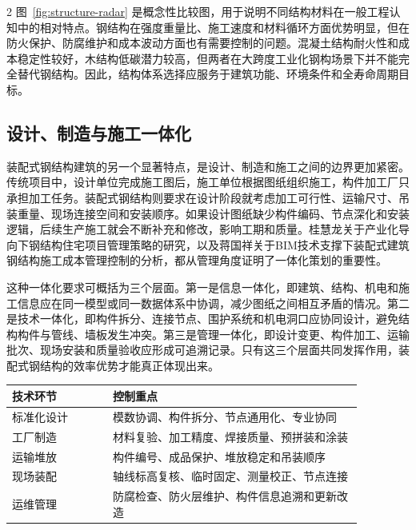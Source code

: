 ﻿\documentclass[UTF8,a4paper,10.5pt]{ctexart}
\newenvironment{bodytext}{\fontsize{10.5pt}{16pt}\selectfont\songti}{}
\begin{document}
\begin{bodytext}
\begin{multicols}{2}
图~\ref{fig:structure-radar} 是概念性比较图，用于说明不同结构材料在一般工程认知中的相对特点。钢结构在强度重量比、施工速度和材料循环方面优势明显，但在防火保护、防腐维护和成本波动方面也有需要控制的问题。混凝土结构耐火性和成本稳定性较好，木结构低碳潜力较高，但两者在大跨度工业化钢构场景下并不能完全替代钢结构。因此，结构体系选择应服务于建筑功能、环境条件和全寿命周期目标。

\subsection{设计、制造与施工一体化}

装配式钢结构建筑的另一个显著特点，是设计、制造和施工之间的边界更加紧密。传统项目中，设计单位完成施工图后，施工单位根据图纸组织施工，构件加工厂只承担加工任务。装配式钢结构则要求在设计阶段就考虑加工可行性、运输尺寸、吊装重量、现场连接空间和安装顺序。如果设计图纸缺少构件编码、节点深化和安装逻辑，后续生产施工就会不断补充和修改，影响工期和质量。桂慧龙关于产业化导向下钢结构住宅项目管理策略的研究，以及蒋国祥关于BIM技术支撑下装配式建筑钢结构施工成本管理控制的分析，都从管理角度证明了一体化策划的重要性\cite{ref-r10,ref-r19}。

这种一体化要求可概括为三个层面。第一是信息一体化，即建筑、结构、机电和施工信息应在同一模型或同一数据体系中协调，减少图纸之间相互矛盾的情况。第二是技术一体化，即构件拆分、连接节点、围护系统和机电洞口应协同设计，避免结构构件与管线、墙板发生冲突。第三是管理一体化，即设计变更、构件加工、运输批次、现场安装和质量验收应形成可追溯记录。只有这三个层面共同发挥作用，装配式钢结构的效率优势才能真正体现出来。

\begin{center}
\label{tab:key-control}
\begin{tabular}{p{0.25\linewidth}p{0.62\linewidth}}
\toprule
技术环节 & 控制重点 \\
\midrule
标准化设计 & 模数协调、构件拆分、节点通用化、专业协同 \\
工厂制造 & 材料复验、加工精度、焊接质量、预拼装和涂装 \\
运输堆放 & 构件编号、成品保护、堆放稳定和吊装顺序 \\
现场装配 & 轴线标高复核、临时固定、测量校正、节点连接 \\
运维管理 & 防腐检查、防火层维护、构件信息追溯和更新改造 \\
\bottomrule
\end{tabular}
\end{center}


\end{multicols}
\end{bodytext}
\end{document}
